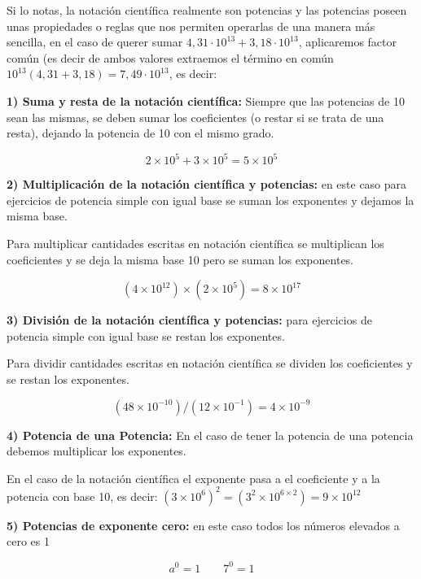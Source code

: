 \documentclass[12pt,a4paper]{article}
\begin{document}
\begin{tcolorbox}[colback=fondorosa,colframe=rojoclaro,title=\textbf{Mini Explicación: operaciones con la notación científica - propiedades de potencias},fonttitle=\bfseries,breakable]

Si lo notas, la notación científica realmente son potencias y las potencias poseen unas propiedades o reglas que nos permiten operarlas de una manera más sencilla, en el caso de querer sumar $4,31 \cdot 10^{13} + 3,18 \cdot 10^{13}$, aplicaremos factor común (es decir de ambos valores extraemos el término en común $10^{13}(4,31 + 3,18) = 7,49 \cdot 10^{13}$, es decir:

\vspace{0.5cm}

\textbf{1) Suma y resta de la notación científica:} Siempre que las potencias de 10 sean las mismas, se deben sumar los coeficientes (o restar si se trata de una resta), dejando la potencia de 10 con el mismo grado.

$$2 \times 10^5 + 3 \times 10^5 = 5 \times 10^5$$

\textbf{2) Multiplicación de la notación científica y potencias:} en este caso para ejercicios de potencia simple con igual base se suman los exponentes y dejamos la misma base.

Para multiplicar cantidades escritas en notación científica se multiplican los coeficientes y se deja la misma base 10 pero se suman los exponentes.

$$(4 \times 10^{12}) \times (2 \times 10^5) = 8 \times 10^{17}$$

\textbf{3) División de la notación científica y potencias:} para ejercicios de potencia simple con igual base se restan los exponentes.

Para dividir cantidades escritas en notación científica se dividen los coeficientes y se restan los exponentes.

$$(48 \times 10^{-10})/(12 \times 10^{-1}) = 4 \times 10^{-9}$$

\textbf{4) Potencia de una Potencia:} En el caso de tener la potencia de una potencia debemos multiplicar los exponentes.

En el caso de la notación científica el exponente pasa a el coeficiente y a la potencia con base 10, es decir: $(3 \times 10^6)^2 = (3^2 \times 10^{6 \times 2})= 9 \times 10^{12}$

\textbf{5) Potencias de exponente cero:} en este caso todos los números elevados a cero es 1

$$a^0 = 1 \qquad 7^0 = 1$$

\end{tcolorbox}
\end{document}
